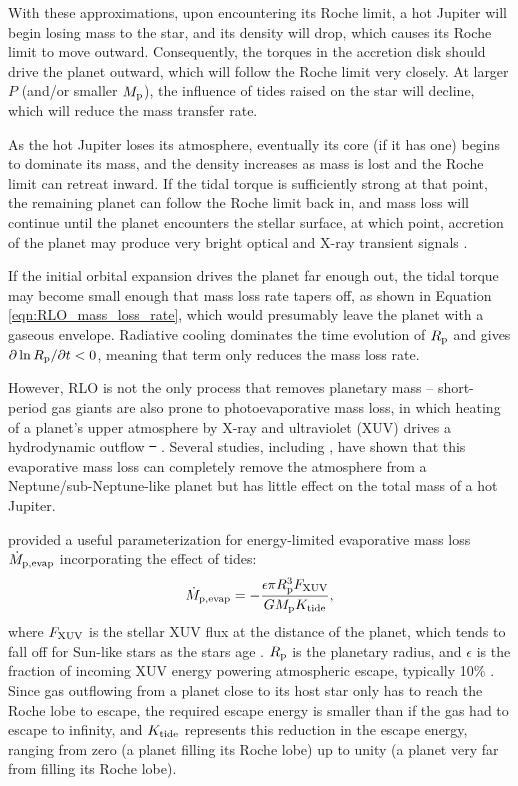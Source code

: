 \documentclass{svjour3}                     %
\providecommand{\DIFadd}[1]{{\protect\color{blue}\uwave{#1}}} %
\providecommand{\DIFdel}[1]{{\protect\color{red}\sout{#1}}}                      %
\providecommand{\DIFaddbegin}{} %
\providecommand{\DIFaddend}{} %
\providecommand{\DIFdelbegin}{} %
\providecommand{\DIFdelend}{} %
\begin{document}
With these approximations, upon encountering its Roche limit, a hot Jupiter will begin losing mass to the star, and its density will drop, which causes its Roche limit to move outward. Consequently, the torques in the accretion disk should drive the planet outward, which will follow the Roche limit very closely. At larger $P$ (and/or smaller $M_{\rm p}$), the influence of tides raised on the star will decline, which will reduce the mass transfer rate. 

As the hot Jupiter loses its atmosphere, eventually its core (if it has one) begins to dominate its mass, and the density increases as mass is lost and the Roche limit can retreat inward. If the tidal torque is sufficiently strong at that point, the remaining planet can follow the Roche limit back in, and mass loss will continue until the planet encounters the stellar surface, at which point, accretion of the planet may produce very bright optical and X-ray transient signals \cite{2012MNRAS.425.2778M}. 

If the initial orbital expansion drives the planet far enough out, the tidal torque may become small enough that mass loss rate tapers off, as shown in Equation \ref{eqn:RLO_mass_loss_rate}, which would presumably leave the planet with a gaseous envelope. Radiative cooling dominates the time evolution of $R_{\rm p}$ and gives $\partial \ln R_{\rm p}/\partial t < 0$, meaning that term only reduces the mass loss rate.

However, RLO is not the only process that removes planetary mass -- short-period gas giants are also prone to photoevaporative mass loss, in which heating of a planet's upper atmosphere by X-ray and ultraviolet (XUV) drives a hydrodynamic outflow  \DIFdelbegin \DIFdel{\mbox{%
\cite{VidalMadjar2003Extended}}%
}\DIFdelend \DIFaddbegin \DIFadd{\mbox{%
\cite{VidalMadjar2003Extended,2014ApJ...783...54K}}%
}\DIFaddend . Several studies, including \cite{Lopez2013Role}, have shown that this evaporative mass loss can completely remove the atmosphere from a Neptune/sub-Neptune-like planet but has little effect on the total mass of a hot Jupiter. 

\cite{Erkaev2007Roche} provided a useful parameterization for energy-limited evaporative mass loss $\dot{M}_{\rm p, evap}$ incorporating the effect of tides:
\begin{equation}
\dot{M}_{\rm p, evap} = -\frac{\epsilon \pi R_{\rm p}^3 F_{\rm XUV}}{G M_{\rm p} K_{\rm tide}},
\label{eqn:evaporative_mass_loss}
\end{equation}
where $F_{\rm XUV}$ is the stellar XUV flux at the distance of the planet, which tends to fall off for Sun-like stars as the stars age \cite{Ribas2005Evolution}. $R_{\rm p}$ is the planetary radius, and $\epsilon$ is the fraction of incoming XUV energy powering atmospheric escape, typically 10\% \cite{Owen2012Planetary}. Since gas outflowing from a planet close to its host star only has to reach the Roche lobe to escape, the required escape energy is smaller than if the gas had to escape to infinity, and $K_{\rm tide}$ represents this reduction in the escape energy, ranging from zero (a planet filling its Roche lobe) up to unity (a planet very far from filling its Roche lobe). 
\end{document}
